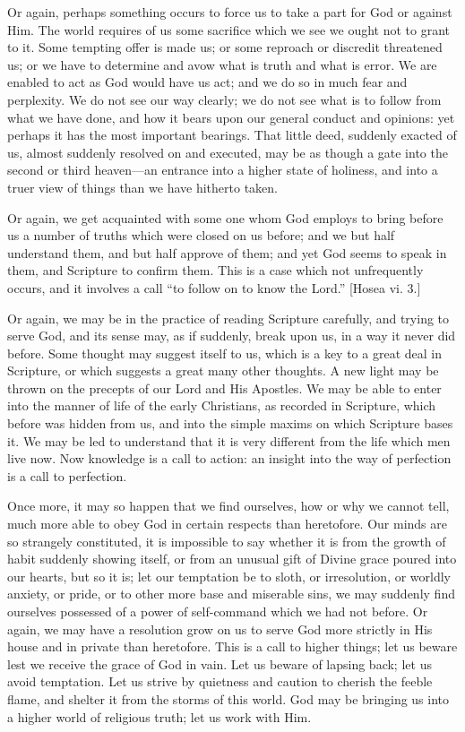 Or again, perhaps something occurs to force us to take a part for
God or against Him. The world requires of us some sacrifice which we
see we ought not to grant to it. Some tempting offer is made us; or
some reproach or discredit threatened us; or we have to determine and
avow what is truth and what is error. We are enabled to act as God
would have us act; and we do so in much fear and perplexity. We do not
see our way clearly; we do not see what is to follow from what we have
done, and how it bears upon our general conduct and opinions: yet
perhaps it has the most important bearings. That little deed, suddenly
exacted of us, almost suddenly resolved on and executed, may be as
though a gate into the second or third heaven—an entrance into a
higher state of holiness, and into a truer view of things than we have
hitherto taken.

Or again, we get acquainted with some one whom God employs to bring
before us a number of truths which were closed on us before; and we
but half understand them, and but half approve of them; and yet God
seems to speak in them, and Scripture to confirm them. This is a case
which not unfrequently occurs, and it involves a call ``to follow
on to know the Lord.'' [Hosea vi. 3.]

Or again, we may be in the practice of reading Scripture carefully,
and trying to serve God, and its sense may, as if suddenly, break upon
us, in a way it never did before. Some thought may suggest itself to
us, which is a key to a great deal in Scripture, or which suggests a
great many other thoughts. A new light may be thrown on the precepts
of our Lord and His Apostles. We may be able to enter into the manner
of life of the early Christians, as recorded in Scripture, which
before was hidden from us, and into the simple maxims on which
Scripture bases it. We may be led to understand that it is very
different from the life which men live now. Now knowledge is a call to
action: an insight into the way of perfection is a call to perfection.

Once more, it may so happen that we find ourselves, how or why we
cannot tell, much more able to obey God in certain respects than
heretofore. Our minds are so strangely constituted, it is impossible
to say whether it is from the growth of habit suddenly showing itself,
or from an unusual gift of Divine grace poured into our hearts, but so
it is; let our temptation be to sloth, or irresolution, or worldly
anxiety, or pride, or to other more base and miserable sins, we may
suddenly find ourselves possessed of a power of self-command which we
had not before. Or again, we may have a resolution grow on us to serve
God more strictly in His house and in private than heretofore. This is
a call to higher things; let us beware lest we receive the grace of
God in vain. Let us beware of lapsing back; let us avoid temptation.
Let us strive by quietness and caution to cherish the feeble flame,
and shelter it from the storms of this world. God may be bringing us
into a higher world of religious truth; let us work with Him.

